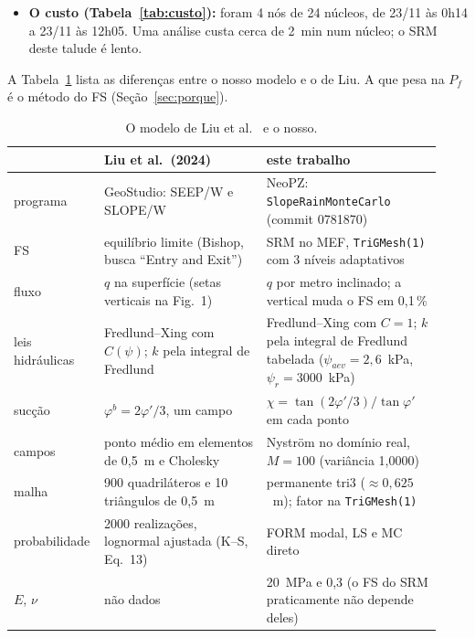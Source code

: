 \documentclass[11pt,a4paper]{article}
\begin{document}
\begin{itemize}
\begin{itemize}
        $CoV$ alvo de 5\,\% não foi atingido). Cada linha custa \anLinhaDois{} análises em média.
      \item \emph{Monte Carlo direto:} \nMCDois{} realizações no cenário 2 (o $N$ do hipercubo latino de Liu) e
        \nMCTres{} no 3, com o IC de Wilson~\cite{wilson1927}. As realizações são pareadas: a de número $n$ tem os
        mesmos $c'$ e $\varphi'$ nos dois cenários.
    \end{itemize}
  \item \textbf{O custo (Tabela~\ref{tab:custo}):} foram 4 nós de 24 núcleos, de 23/11 às 0h14 a 23/11 às 12h05. Uma
    análise custa cerca de 2~min num núcleo; o SRM deste talude é lento.
\end{itemize}



A Tabela~\ref{tab:modelo} lista as diferenças entre o nosso modelo e o de Liu. A que pesa na $P_f$ é o método do FS
(Seção~\ref{sec:porque}).

\begin{table}[htbp]\centering\footnotesize\setlength{\tabcolsep}{3pt}
\caption{O modelo de Liu et al.~\cite{liu2024} e o nosso.}\label{tab:modelo}
\begin{tabular}{p{0.16\linewidth}p{0.37\linewidth}p{0.40\linewidth}}\toprule
& Liu et al.\ (2024) & este trabalho \\\midrule
programa & GeoStudio: SEEP/W e SLOPE/W & NeoPZ: \texttt{SlopeRainMonteCarlo} (commit 0781870) \\
FS & equilíbrio limite (Bishop, busca ``Entry and Exit'') & SRM no MEF, \texttt{TriGMesh(1)} com 3 níveis adaptativos \\
fluxo & $q$ na superfície (setas verticais na Fig.~1) & $q$ por metro inclinado; a vertical muda o FS em 0,1\,\% \\
leis hidráulicas & Fredlund--Xing com $C(\psi)$; $k$ pela integral de Fredlund & Fredlund--Xing com $C = 1$; $k$ pela
  integral de Fredlund tabelada ($\psi_{aev} = 2{,}6$~kPa, $\psi_r = 3000$~kPa) \\
sucção & $\varphi^b = 2\varphi'/3$, um campo & $\chi = \tan(2\varphi'/3)/\tan\varphi'$ em cada ponto \\
campos & ponto médio em elementos de 0,5~m e Cholesky & Nyström no domínio real, $M = 100$ (variância 1,0000) \\
malha & 900 quadriláteros e 10 triângulos de 0,5~m & permanente tri3 ($\approx 0{,}625$~m); fator na
  \texttt{TriGMesh(1)} \\
probabilidade & 2000 realizações, lognormal ajustada (K--S, Eq.~13) & FORM modal, LS e MC direto \\
$E$, $\nu$ & não dados & 20~MPa e 0,3 (o FS do SRM praticamente não depende deles) \\
\bottomrule\end{tabular}\end{table}
\end{document}
